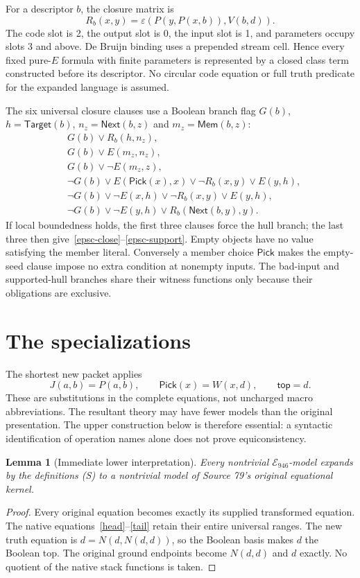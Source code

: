 \documentclass[11pt]{article}
\newtheorem{lemma}[theorem]{Lemma}
\newcommand{\eps}{\varepsilon}
\begin{document}
For a descriptor $b$, the closure matrix is
\[
 R_b(x,y)=\eps(P(y,P(x,b)),V(b,d)).
\]
The code slot is 2, the output slot is 0, the input slot is 1, and parameters
occupy slots 3 and above. De Bruijn binding uses a prepended stream cell.
Hence every fixed pure-$E$ formula with finite parameters is represented
by a closed class term constructed before its descriptor. No circular code
equation or full truth predicate for the expanded language is assumed.

The six universal closure clauses use a Boolean branch flag $G(b)$,
$h=\mathsf{Target}(b)$, $n_z=\mathsf{Next}(b,z)$ and
$m_z=\mathsf{Mem}(b,z)$:
\begin{align*}
 &G(b)\lor R_b(h,n_z),\\
 &G(b)\lor E(m_z,n_z),\\
 &G(b)\lor\neg E(m_z,z),\\
 &\neg G(b)\lor E(\mathsf{Pick}(x),x)\lor\neg R_b(x,y)\lor E(y,h),\\
 &\neg G(b)\lor\neg E(x,h)\lor\neg R_b(x,y)\lor E(y,h),\\
 &\neg G(b)\lor\neg E(y,h)\lor R_b(\mathsf{Next}(b,y),y).
\end{align*}
If local boundedness holds, the first three clauses force the hull branch;
the last three then give~\eqref{epsc-close}--\eqref{epsc-support}. Empty
objects have no value satisfying the member literal. Conversely a member
choice $\mathsf{Pick}$ makes the empty-seed clause impose no extra condition
at nonempty inputs. The bad-input and supported-hull branches share their
witness functions only because their obligations are exclusive.

\section{The specializations}

The shortest new packet applies
\[
             J(a,b)=P(a,b),\qquad
             \mathsf{Pick}(x)=W(x,d),\qquad
             \mathsf{top}=d.                     \tag{S}
\]
These are substitutions in the complete equations, not uncharged macro
abbreviations. The resultant theory may have fewer models than the original
presentation. The upper construction below is therefore essential: a
syntactic identification of operation names alone does not prove
equiconsistency.

\begin{lemma}[Immediate lower interpretation]
Every nontrivial $\mathcal E_{946}$-model expands by the definitions (S)
to a nontrivial model of Source 79's original equational kernel.
\end{lemma}
\begin{proof}
Every original equation becomes exactly its supplied transformed equation.
The native equations~\eqref{head}--\eqref{tail} retain their entire
universal ranges. The new truth equation is
$d=N(d,N(d,d))$, so the Boolean basis makes $d$ the Boolean top. The
original ground endpoints become $N(d,d)$ and $d$ exactly. No quotient of
the native stack functions is taken.
\end{proof}
\end{document}
